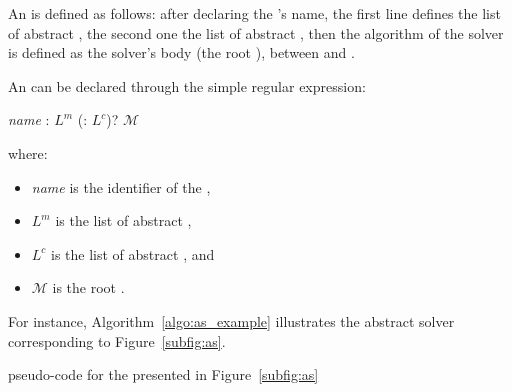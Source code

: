 An \as{} is defined as follows: after declaring the \mbox{}'s name, the first line defines the list of abstract \oms, the second one the list of abstract \opchs, then the algorithm of the solver is defined as the solver's body (the root \cm), between \mbox{} and \mbox{}.

An \as{} can be declared through the  simple regular expression:

\begin{center}
 {\it name} : $L^m$ (: $L^c$)?  $\mathcal{M}$ 
\end{center}

where:
\begin{itemize}
\item {\it name} is the identifier of the \as{}, 
\item $L^m$ is the list of abstract \oms{},
\item $L^c$ is the list of abstract \opchs{}, and
\item $\mathcal{M}$ is the root \cm.
\end{itemize}

For instance, Algorithm~\ref{algo:as_example} illustrates the abstract solver corresponding to Figure~\ref{subfig:as}.

\begin{algorithm}[H]
\dontprintsemicolon
\SetNoline
{}
\caption{\posl{} pseudo-code for the \as{} presented in Figure~\ref{subfig:as}}\label{algo:as_example}
\end{algorithm}	
